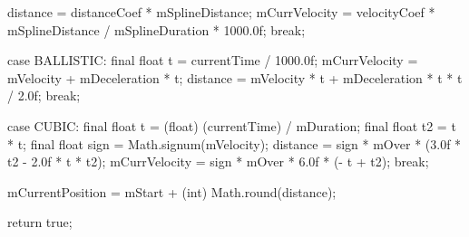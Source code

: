 {{{{{                    distance = distanceCoef * mSplineDistance;
                    mCurrVelocity = velocityCoef * mSplineDistance / mSplineDuration * 1000.0f;
                    break;
                }

                case BALLISTIC: {
                    final float t = currentTime / 1000.0f;
                    mCurrVelocity = mVelocity + mDeceleration * t;
                    distance = mVelocity * t + mDeceleration * t * t / 2.0f;
                    break;
                }

                case CUBIC: {
                    final float t = (float) (currentTime) / mDuration;
                    final float t2 = t * t;
                    final float sign = Math.signum(mVelocity);
                    distance = sign * mOver * (3.0f * t2 - 2.0f * t * t2); 
                    mCurrVelocity = sign * mOver * 6.0f * (- t + t2); 
                    break;
                }
            }

            mCurrentPosition = mStart + (int) Math.round(distance);

            return true;
        }
    }
}
